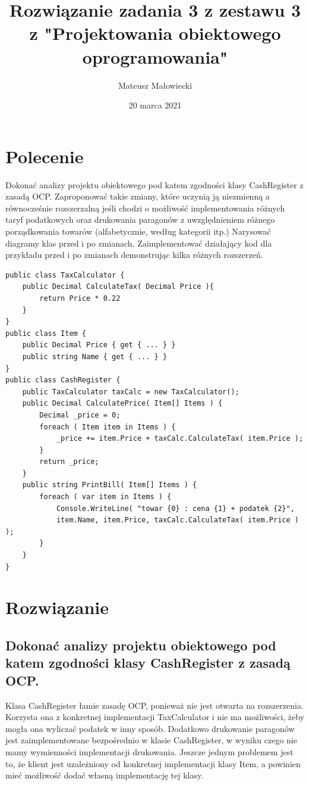 \documentclass[10pt, a4paper]{article}
\title{Rozwiązanie zadania 3 z zestawu 3 z "Projektowania obiektowego oprogramowania"}
\author{Mateusz Małowiecki}
\date{20 marca 2021}
\begin{document}
\maketitle
\section*{Polecenie}
Dokonać analizy projektu obiektowego pod katem zgodności klasy CashRegister z zasadą OCP. Zaproponować takie zmiany, które uczynią ją
niezmienną a równocześnie rozszerzalną jeśli chodzi o możliwość implementowania różnych
taryf podatkowych oraz drukowania paragonów z uwzględnieniem różnego porządkowania
towarów (alfabetycznie, według kategorii itp.)
Narysować diagramy klas przed i po zmianach. Zaimplementować działający kod dla przykładu przed i po zmianach demonstrując kilka różnych rozszerzeń.
\begin{verbatim}
public class TaxCalculator {
    public Decimal CalculateTax( Decimal Price ){
        return Price * 0.22 
    }
}
public class Item {
    public Decimal Price { get { ... } }
    public string Name { get { ... } }
}
public class CashRegister {
    public TaxCalculator taxCalc = new TaxCalculator();
    public Decimal CalculatePrice( Item[] Items ) {
        Decimal _price = 0;
        foreach ( Item item in Items ) {
            _price += item.Price + taxCalc.CalculateTax( item.Price );
        }
        return _price;
    }
    public string PrintBill( Item[] Items ) {
        foreach ( var item in Items ) {
            Console.WriteLine( "towar {0} : cena {1} + podatek {2}", 
            item.Name, item.Price, taxCalc.CalculateTax( item.Price ) );
        }
    }
}
\end{verbatim}
\section*{Rozwiązanie}
\subsection*{Dokonać analizy projektu obiektowego pod katem zgodności klasy CashRegister z zasadą OCP.}
Klasa CashRegister łamie zasadę OCP, ponieważ nie jest otwarta na rozszerzenia. Korzysta ona z konkretnej implementacji TaxCalculator i nie ma możliwości, żeby mogła ona wyliczać podatek w inny sposób. Dodatkowo drukowanie paragonów jest zaimplementowane bezpośrednio w klasie CashRegister, w wyniku czego nie mamy wymienności implementacji drukowania. Jeszcze jednym problemem jest to, że klient jest uzależniony od konkretnej implementacji klasy Item, a powinien mieć możliwość dodać własną implementację tej klasy.
\end{document}
